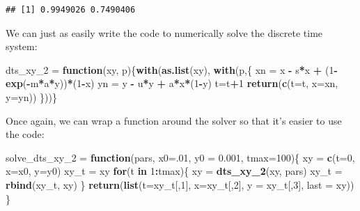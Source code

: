 \documentclass[
]{book}
\newenvironment{Shaded}{\begin{snugshade}}{\end{snugshade}}
\newcommand{\AttributeTok}[1]{\textcolor[rgb]{0.13,0.29,0.53}{#1}}
\newcommand{\ControlFlowTok}[1]{\textcolor[rgb]{0.13,0.29,0.53}{\textbf{#1}}}
\newcommand{\DecValTok}[1]{\textcolor[rgb]{0.00,0.00,0.81}{#1}}
\newcommand{\FloatTok}[1]{\textcolor[rgb]{0.00,0.00,0.81}{#1}}
\newcommand{\FunctionTok}[1]{\textcolor[rgb]{0.13,0.29,0.53}{\textbf{#1}}}
\newcommand{\NormalTok}[1]{#1}
\newcommand{\OtherTok}[1]{\textcolor[rgb]{0.56,0.35,0.01}{#1}}
\newcommand{\SpecialCharTok}[1]{\textcolor[rgb]{0.81,0.36,0.00}{\textbf{#1}}}
\begin{document}
\begin{verbatim}
## [1] 0.9949026 0.7490406
\end{verbatim}

We can just as easily write the code to numerically solve the discrete time system:

\begin{Shaded}
\begin{Highlighting}[]
\NormalTok{dts\_xy\_2 }\OtherTok{=} \ControlFlowTok{function}\NormalTok{(xy, p)\{}\FunctionTok{with}\NormalTok{(}\FunctionTok{as.list}\NormalTok{(xy), }\FunctionTok{with}\NormalTok{(p,\{}
\NormalTok{  xn }\OtherTok{=}\NormalTok{ x }\SpecialCharTok{{-}}\NormalTok{ s}\SpecialCharTok{*}\NormalTok{x }\SpecialCharTok{+}\NormalTok{ (}\DecValTok{1}\SpecialCharTok{{-}}\FunctionTok{exp}\NormalTok{(}\SpecialCharTok{{-}}\NormalTok{m}\SpecialCharTok{*}\NormalTok{a}\SpecialCharTok{*}\NormalTok{y))}\SpecialCharTok{*}\NormalTok{(}\DecValTok{1}\SpecialCharTok{{-}}\NormalTok{x) }
\NormalTok{  yn }\OtherTok{=}\NormalTok{ y }\SpecialCharTok{{-}}\NormalTok{ u}\SpecialCharTok{*}\NormalTok{y }\SpecialCharTok{+}\NormalTok{ a}\SpecialCharTok{*}\NormalTok{x}\SpecialCharTok{*}\NormalTok{(}\DecValTok{1}\SpecialCharTok{{-}}\NormalTok{y) }
\NormalTok{  t}\OtherTok{=}\NormalTok{t}\SpecialCharTok{+}\DecValTok{1}
  \FunctionTok{return}\NormalTok{(}\FunctionTok{c}\NormalTok{(}\AttributeTok{t=}\NormalTok{t, }\AttributeTok{x=}\NormalTok{xn, }\AttributeTok{y=}\NormalTok{yn))}
\NormalTok{\}))\}}
\end{Highlighting}
\end{Shaded}

Once again, we can wrap a function around the solver so that it's easier to use the code:

\begin{Shaded}
\begin{Highlighting}[]
\NormalTok{solve\_dts\_xy\_2 }\OtherTok{=} \ControlFlowTok{function}\NormalTok{(pars, }\AttributeTok{x0=}\NormalTok{.}\DecValTok{01}\NormalTok{, }\AttributeTok{y0 =} \FloatTok{0.001}\NormalTok{, }\AttributeTok{tmax=}\DecValTok{100}\NormalTok{)\{}
\NormalTok{   xy }\OtherTok{=} \FunctionTok{c}\NormalTok{(}\AttributeTok{t=}\DecValTok{0}\NormalTok{, }\AttributeTok{x=}\NormalTok{x0, }\AttributeTok{y=}\NormalTok{y0) }
\NormalTok{   xy\_t }\OtherTok{=}\NormalTok{ xy }
   \ControlFlowTok{for}\NormalTok{(t }\ControlFlowTok{in} \DecValTok{1}\SpecialCharTok{:}\NormalTok{tmax)\{}
\NormalTok{     xy }\OtherTok{=} \FunctionTok{dts\_xy\_2}\NormalTok{(xy, pars)}
\NormalTok{     xy\_t }\OtherTok{=} \FunctionTok{rbind}\NormalTok{(xy\_t, xy)}
\NormalTok{   \}}
   \FunctionTok{return}\NormalTok{(}\FunctionTok{list}\NormalTok{(}\AttributeTok{t=}\NormalTok{xy\_t[,}\DecValTok{1}\NormalTok{], }\AttributeTok{x=}\NormalTok{xy\_t[,}\DecValTok{2}\NormalTok{], }\AttributeTok{y =}\NormalTok{ xy\_t[,}\DecValTok{3}\NormalTok{], }\AttributeTok{last =}\NormalTok{ xy)) }
\NormalTok{\}}
\end{Highlighting}
\end{Shaded}
\end{document}
